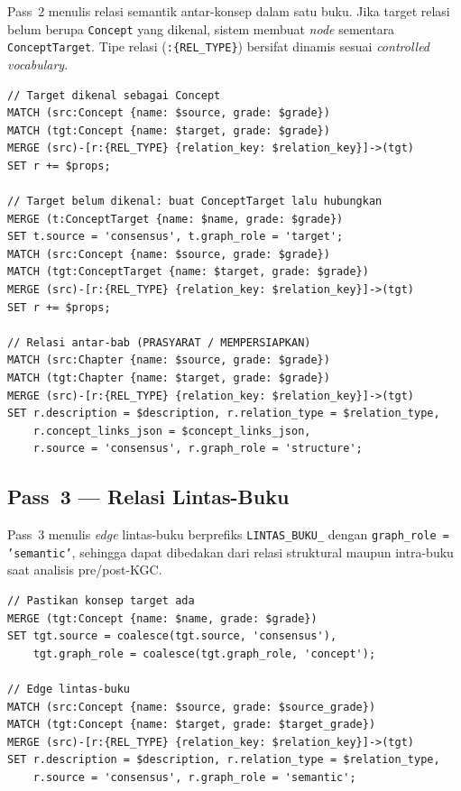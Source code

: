 \documentclass[main]{subfiles}
\begin{document}
Pass~2 menulis relasi semantik antar-konsep dalam satu buku. Jika target
relasi belum berupa \texttt{Concept} yang dikenal, sistem membuat
\textit{node} sementara \texttt{ConceptTarget}. Tipe relasi
(\texttt{:\{REL\_TYPE\}}) bersifat dinamis sesuai \textit{controlled vocabulary}.

\begin{lstlisting}[style=cypherbox,caption={Relasi intra-buku konsep-ke-konsep dan konsep-ke-target (Pass~2).},label={lst:cypher-pass2}]
// Target dikenal sebagai Concept
MATCH (src:Concept {name: $source, grade: $grade})
MATCH (tgt:Concept {name: $target, grade: $grade})
MERGE (src)-[r:{REL_TYPE} {relation_key: $relation_key}]->(tgt)
SET r += $props;

// Target belum dikenal: buat ConceptTarget lalu hubungkan
MERGE (t:ConceptTarget {name: $name, grade: $grade})
SET t.source = 'consensus', t.graph_role = 'target';
MATCH (src:Concept {name: $source, grade: $grade})
MATCH (tgt:ConceptTarget {name: $target, grade: $grade})
MERGE (src)-[r:{REL_TYPE} {relation_key: $relation_key}]->(tgt)
SET r += $props;

// Relasi antar-bab (PRASYARAT / MEMPERSIAPKAN)
MATCH (src:Chapter {name: $source, grade: $grade})
MATCH (tgt:Chapter {name: $target, grade: $grade})
MERGE (src)-[r:{REL_TYPE} {relation_key: $relation_key}]->(tgt)
SET r.description = $description, r.relation_type = $relation_type,
    r.concept_links_json = $concept_links_json,
    r.source = 'consensus', r.graph_role = 'structure';
\end{lstlisting}

\subsection{Pass~3 --- Relasi Lintas-Buku}

Pass~3 menulis \textit{edge} lintas-buku berprefiks \texttt{LINTAS\_BUKU\_}
dengan \texttt{graph\_role = 'semantic'}, sehingga dapat dibedakan dari relasi
struktural maupun intra-buku saat analisis pre/post-KGC.

\begin{lstlisting}[style=cypherbox,caption={Penulisan edge lintas-buku (Pass~3).},label={lst:cypher-pass3}]
// Pastikan konsep target ada
MERGE (tgt:Concept {name: $name, grade: $grade})
SET tgt.source = coalesce(tgt.source, 'consensus'),
    tgt.graph_role = coalesce(tgt.graph_role, 'concept');

// Edge lintas-buku
MATCH (src:Concept {name: $source, grade: $source_grade})
MATCH (tgt:Concept {name: $target, grade: $target_grade})
MERGE (src)-[r:{REL_TYPE} {relation_key: $relation_key}]->(tgt)
SET r.description = $description, r.relation_type = $relation_type,
    r.source = 'consensus', r.graph_role = 'semantic';
\end{lstlisting}
\end{document}
